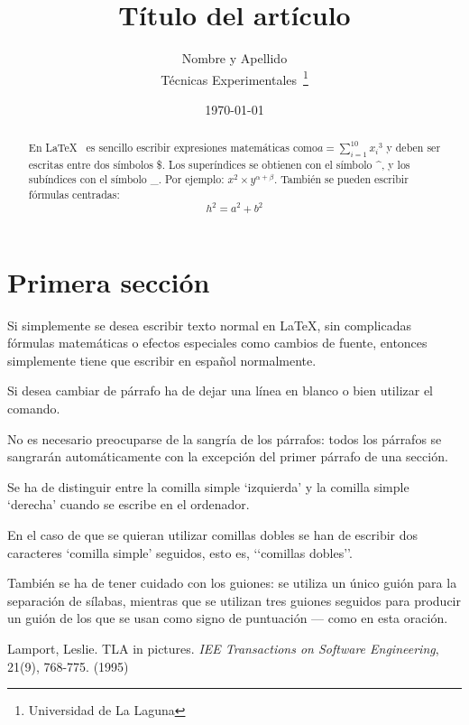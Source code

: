\documentclass[a4paper,12pt]{article}
\begin{document}
\title{Título del artículo}
\author{Nombre y Apellido \\
        Técnicas Experimentales~\footnote{Universidad de La Laguna}
        }
\date{\today}
\maketitle
\begin{abstract}
   En \LaTeX{}~\cite{Lam:86} es sencillo escribir expresiones
   matemáticas como$a=\sum_{i=1}^{10} {x_i}^{3}$
   y deben ser escritas entre dos símbolos \$.
   Los superíndices se obtienen con el símbolo \^{}, y
   los subíndices con el símbolo \_.
   Por ejemplo: $x^2 \times y^{\alpha + \beta}$.
   También se pueden escribir fórmulas centradas:
   \[h^2=a^2 + b^2\]
\end{abstract}

\section{Primera sección}
Si simplemente se desea escribir texto normal en LaTeX,
sin complicadas f\'ormulas matem\'aticas o efectos especiales
como cambios de fuente, entonces simplemente tiene que escribir
en espa\~nol normalmente.\par
Si desea cambiar de  párrafo ha de dejar una  línea en blanco o bien
utilizar el comando. \par
No es necesario preocuparse de la sangría de los párrafos:
todos los párrafos se sangrarán automáticamente con la excepción
del primer párrafo de una sección.\par
Se ha de distinguir entre la comilla simple ‘izquierda’
y la comilla simple ‘derecha’ cuando se escribe en el ordenador.\par
En el caso de que se quieran utilizar comillas dobles se han de
escribir dos caracteres ‘comilla simple’ seguidos, esto es,
‘‘comillas dobles’’.\par
También se ha de tener cuidado con los guiones: se utiliza un único
guión para la separación de sílabas, mientras que se utilizan
tres guiones seguidos para producir un guión de los que se usan
como signo de puntuación --- como en esta oración.
\begin{thebibliography}{00}
    Lamport, Leslie.
    TLA in pictures.
    \emph{IEE Transactions on Software Engineering},
    21(9), 768-775.
    (1995)
\end{thebibliography}
\end{document}
